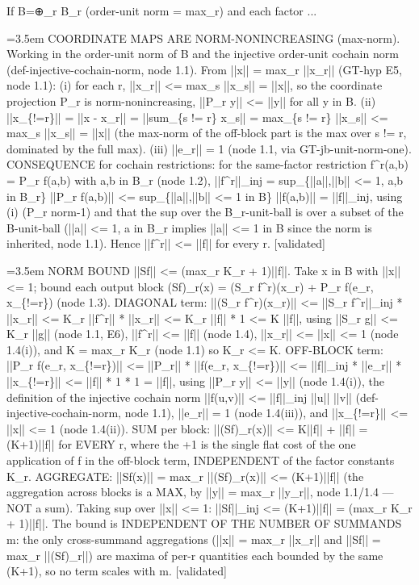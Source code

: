 \documentclass{article}
\newcommand{\step}[1]{\par\noindent\hangindent=3.5em\hangafter=1%
  \makebox[3.5em][l]{\textbf{#1.}}}
\newcommand{\steptag}[1]{\hfill{\small\textsf{[#1]}}}
\begin{document}
\begin{proofbox}{If B=⊕\_r B\_r (order-unit norm = max\_r) and each factor ...}
\step{1.4} COORDINATE MAPS ARE NORM-NONINCREASING (max-norm). Working in the order-unit norm of B and the injective order-unit cochain norm (def-injective-cochain-norm, node 1.1). From ||x|| = max\_r ||x\_r|| (GT-hyp E5, node 1.1): (i) for each r, ||x\_r|| <= max\_s ||x\_s|| = ||x||, so the coordinate projection P\_r is norm-nonincreasing, ||P\_r y|| <= ||y|| for all y in B. (ii) ||x\_\{!=r\}|| = ||x - x\_r|| = ||sum\_\{s != r\} x\_s|| = max\_\{s != r\} ||x\_s|| <= max\_s ||x\_s|| = ||x|| (the max-norm of the off-block part is the max over s != r, dominated by the full max). (iii) ||e\_r|| = 1 (node 1.1, via GT-jb-unit-norm-one). CONSEQUENCE for cochain restrictions: for the same-factor restriction f\textasciicircum{}r(a,b) = P\_r f(a,b) with a,b in B\_r (node 1.2), ||f\textasciicircum{}r||\_inj = sup\_\{||a||,||b|| <= 1, a,b in B\_r\} ||P\_r f(a,b)|| <= sup\_\{||a||,||b|| <= 1 in B\} ||f(a,b)|| = ||f||\_inj, using (i) (P\_r norm-1) and that the sup over the B\_r-unit-ball is over a subset of the B-unit-ball (||a|| <= 1, a in B\_r implies ||a|| <= 1 in B since the norm is inherited, node 1.1). Hence ||f\textasciicircum{}r|| <= ||f|| for every r. \steptag{validated} \\[4pt]
\step{1.5} NORM BOUND ||Sf|| <= (max\_r K\_r + 1)||f||. Take x in B with ||x|| <= 1; bound each output block (Sf)\_r(x) = (S\_r f\textasciicircum{}r)(x\_r) + P\_r f(e\_r, x\_\{!=r\}) (node 1.3). DIAGONAL term: ||(S\_r f\textasciicircum{}r)(x\_r)|| <= ||S\_r f\textasciicircum{}r||\_inj * ||x\_r|| <= K\_r ||f\textasciicircum{}r|| * ||x\_r|| <= K\_r ||f|| * 1 <= K ||f||, using ||S\_r g|| <= K\_r ||g|| (node 1.1, E6), ||f\textasciicircum{}r|| <= ||f|| (node 1.4), ||x\_r|| <= ||x|| <= 1 (node 1.4(i)), and K = max\_r K\_r (node 1.1) so K\_r <= K. OFF-BLOCK term: ||P\_r f(e\_r, x\_\{!=r\})|| <= ||P\_r|| * ||f(e\_r, x\_\{!=r\})|| <= ||f||\_inj * ||e\_r|| * ||x\_\{!=r\}|| <= ||f|| * 1 * 1 = ||f||, using ||P\_r y|| <= ||y|| (node 1.4(i)), the definition of the injective cochain norm ||f(u,v)|| <= ||f||\_inj ||u|| ||v|| (def-injective-cochain-norm, node 1.1), ||e\_r|| = 1 (node 1.4(iii)), and ||x\_\{!=r\}|| <= ||x|| <= 1 (node 1.4(ii)). SUM per block: ||(Sf)\_r(x)|| <= K||f|| + ||f|| = (K+1)||f|| for EVERY r, where the +1 is the single flat cost of the one application of f in the off-block term, INDEPENDENT of the factor constants K\_r. AGGREGATE: ||Sf(x)|| = max\_r ||(Sf)\_r(x)|| <= (K+1)||f|| (the aggregation across blocks is a MAX, by ||y|| = max\_r ||y\_r||, node 1.1/1.4 — NOT a sum). Taking sup over ||x|| <= 1: ||Sf||\_inj <= (K+1)||f|| = (max\_r K\_r + 1)||f||. The bound is INDEPENDENT OF THE NUMBER OF SUMMANDS m: the only cross-summand aggregations (||x|| = max\_r ||x\_r|| and ||Sf|| = max\_r ||(Sf)\_r||) are maxima of per-r quantities each bounded by the same (K+1), so no term scales with m. \steptag{validated} \\[4pt]

\end{proofbox}
\end{document}
